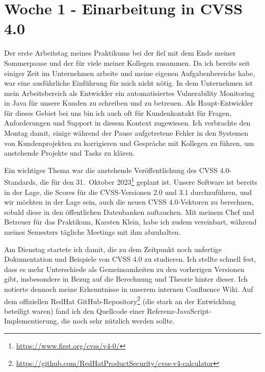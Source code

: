 \section{Woche 1 - Einarbeitung in CVSS 4.0} \label{sec:bericht-wo-1}


\lweekdaymarginpar{\weekdayMondayLong}

Der erste Arbeitstag meines Praktikums bei der {\metaeffekt} fiel mit dem Ende meiner Sommerpause und der für viele meiner Kollegen zusammen.
Da ich bereits seit einiger Zeit im Unternehmen arbeite und meine eigenen Aufgabenbereiche habe, war eine ausführliche Einführung für mich nicht nötig.
In dem Unternehmen ist mein Arbeitsbereich als Entwickler ein automatisiertes Vulnerability Monitoring in Java für unsere Kunden zu schreiben und zu betreuen.
Als Haupt-Entwickler für dieses Gebiet bei uns bin ich auch oft für Kundenkontakt für Fragen, Anforderungen und Support in diesem Kontext zugewiesen.
Ich verbrachte den Montag damit, einige während der Pause aufgetretene Fehler in den Systemen von Kundenprojekten zu korrigieren und Gespräche mit Kollegen zu führen, um anstehende Projekte und Tasks zu klären.

Ein wichtiges Thema war die anstehende Veröffentlichung des CVSS 4.0-Standards, die für den 31.\ Oktober 2023\footnote{\url{https://www.first.org/cvss/v4-0/}} geplant ist.
Unsere Software ist bereits in der Lage, die Scores für die CVSS-Versionen 2.0 und 3.1 durchzuführen, und wir möchten in der Lage sein, auch die neuen CVSS 4.0-Vektoren zu berechnen, sobald diese in den öffentlichen Datenbanken auftauchen.
Mit meinem Chef und Betreuer für das Praktikum, Karsten Klein, habe ich zudem vereinbart, während meines Semesters tägliche Meetings mit ihm abzuhalten.

\sweekdaymarginpar{\weekdayTuesdayLong}

Am Dienstag startete ich damit, die zu dem Zeitpunkt noch unfertige Dokumentation und Beispiele von CVSS 4.0 zu studieren.
Ich stellte schnell fest, dass es mehr Unterschiede als Gemeinsamkeiten zu den vorherigen Versionen gibt, insbesondere in Bezug auf die Berechnung und Theorie hinter dieser.
Ich notierte dennoch meine Erkenntnisse in unserem internen Confluence Wiki.
Auf dem offiziellen RedHat GitHub-Repository\footnote{\url{https://github.com/RedHatProductSecurity/cvss-v4-calculator}} (die stark an der Entwicklung beteiligt waren) fand ich den Quellcode einer Referenz-JavaScript-Implementierung, die noch sehr nützlich werden sollte.

